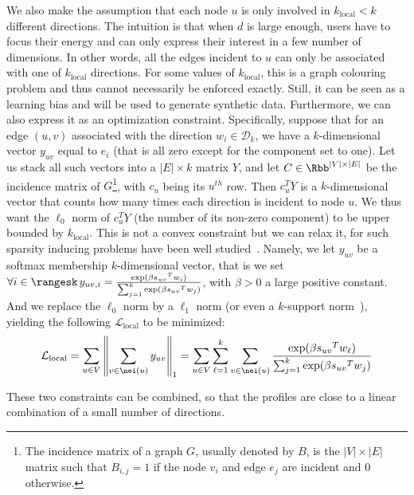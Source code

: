 \medskip

We also make the assumption that each node $u$ is only involved in $k_\mathrm{local} < k$
different directions. The intuition is that when $d$ is large enough, users have to focus their
energy and can only express their interest in a few number of dimensions. In other words, all the
edges incident to $u$ can only be associated with one of $k_\mathrm{local}$ directions. For
some values of
$k_\mathrm{local}$, this is a \NPc{} graph colouring problem and thus cannot necessarily be enforced
exactly. Still, it can be seen as a learning bias and will be used to generate synthetic data.
Furthermore, we can also express it as an optimization constraint. Specifically, suppose that for
an edge $(u,v)$ associated with the direction $w_i \in \mathcal{D}_k$, we have a $k$-dimensional
vector $y_{uv}$ equal to $e_i$ (that is all zero except for the \ith{} component set to one). Let
us stack all such vectors into a $|E| \times k$ matrix $Y$, and let $C \in \Rbb^{|V| \times |E|}$ be
the incidence matrix of $G$\footnote{The incidence matrix of a graph $G$, usually denoted by $B$, is
the $|V| \times |E|$ matrix such that $B_{i,j} = 1$ if the node $v_i$ and edge $e_j$ are incident
and 0 otherwise.}, with $c_u$ being its $u^{th}$ row. Then $c_u^TY$ is a $k$-dimensional vector that counts
how many times each direction is incident to node $u$. We thus want the $\ell_0$ norm of $c_u^TY$
(\ie the number of its non-zero component) to be upper bounded by $k_\mathrm{local}$.
This is not a convex constraint but we can relax it, for such sparsity inducing problems have been
well studied~\autocite{sparseOptim12}. Namely, we let $y_{uv}$ be a softmax membership
$k$-dimensional vector, that is we set $\forall i \in \rangesk\, y_{uv,i} =
\frac{\exp(\beta{s_{uv}}^T w_i)}{\sum_{j=1}^k \exp(\beta {s_{uv}}^T w_j)} $, with $\beta>0$ a large
positive constant.  And we replace the $\ell_0$ norm by a $\ell_1$ norm (or even a $k$-support
norm~\autocite{KsupportNorm12}), yielding the following $\mathcal{L}_{\mathrm{local}}$ to be
minimized:
\begin{equation}
  \label{eq:edge_local_loss}
  \mathcal{L}_{\mathrm{local}} =
  \sum_{u \in V} \left\| \sum_{v \in \nei(u)} y_{uv} \right\|_1 =
  \sum_{u \in V} \sum_{\ell = 1}^k \sum_{v \in \nei(u)}
  \frac{\exp(\beta{s_{uv}}^T w_\ell)}{\sum_{j=1}^k \exp(\beta {s_{uv}}^T w_j)}
\end{equation}

These two constraints can be combined, so that the profiles are close to a linear combination of a
small number of directions.

